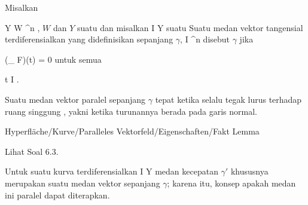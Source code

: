 {}
{

Misalkan

\mavergleichskette
{\vergleichskette
{ Y
}
{ \subseteq }{ W
}
{ \subseteq }{ \R^n
}
{    }{
}
{   }{
}
}
{}{}{,}
$W$
dan $Y$ suatu
dan misalkan
\maabb {\gamma} { I } { Y
} {}
suatu
Suatu medan vektor tangensial terdiferensialkan yang didefinisikan sepanjang $\gamma$,
 { I } {\R^n
} {}
disebut
$\gamma$ jika

\mavergleichskettedisp
{\vergleichskette
{ (\nabla_{\gamma} F)(t)
}
{ =} { 0
}
{ } {
}
{ } {
}
{ } {
}
}
{}{}{}
untuk semua

\mavergleichskette
{\vergleichskette
{ t
}
{ \in }{ I
}
{  }{
}
{    }{
}
{   }{
}
}
{}{}{.}

}

Suatu medan vektor paralel sepanjang $\gamma$ tepat ketika
 selalu tegak lurus terhadap ruang singgung
, yakni ketika turunannya berada pada garis normal.


{Hyperfläche/Kurve/Paralleles Vektorfeld/Eigenschaften/Fakt}
{Lemma}
{}
{

\faktzusatz {}
\faktzusatz {}

 }
{ Lihat Soal 6.3. }

Untuk suatu kurva terdiferensialkan
\maabbdisp {\gamma} { I } { Y
} {}
medan kecepatan $\gamma'$ khususnya merupakan suatu medan vektor sepanjang $\gamma$; karena itu, konsep apakah medan ini paralel dapat diterapkan.



